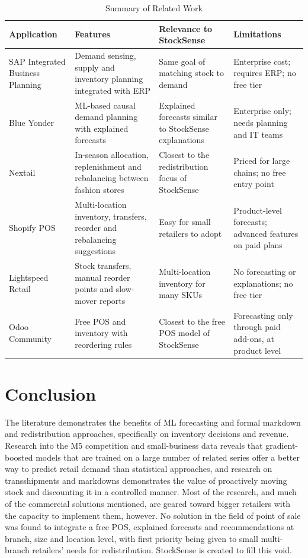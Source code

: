 \documentclass{StockSense}
\begin{document}
\begin{table}[!htbp]
\centering
\caption{Summary of Related Work}
\label{tab:related-work}
\begin{tabular}{|L{3.2cm}|L{4.1cm}|L{3.4cm}|L{3.4cm}|}
\hline
\textbf{Application} & \textbf{Features} & \textbf{Relevance to StockSense} & \textbf{Limitations} \\ \hline
SAP Integrated Business Planning~\cite{sapibp} & Demand sensing, supply and inventory planning integrated with ERP & Same goal of matching stock to demand & Enterprise cost; requires ERP; no free tier \\ \hline
Blue Yonder~\cite{blueyonder} & ML-based causal demand planning with explained forecasts & Explained forecasts similar to StockSense explanations & Enterprise only; needs planning and IT teams \\ \hline
Nextail~\cite{nextail} & In-season allocation, replenishment and rebalancing between fashion stores & Closest to the redistribution focus of StockSense & Priced for large chains; no free entry point \\ \hline
Shopify POS~\cite{shopifypos} & Multi-location inventory, transfers, reorder and rebalancing suggestions & Easy for small retailers to adopt & Product-level forecasts; advanced features on paid plans \\ \hline
Lightspeed Retail~\cite{lightspeed} & Stock transfers, manual reorder points and slow-mover reports & Multi-location inventory for many SKUs & No forecasting or explanations; no free tier \\ \hline
Odoo Community~\cite{odoo} & Free POS and inventory with reordering rules & Closest to the free POS model of StockSense & Forecasting only through paid add-ons, at product level \\ \hline
\end{tabular}
\end{table}

\section{Conclusion}

The literature demonstrates the benefits of ML forecasting and formal markdown and redistribution approaches, specifically on inventory decisions and revenue. Research into the M5 competition and small-business data reveals that gradient-boosted models that are trained on a large number of related series offer a better way to predict retail demand than statistical approaches, and research on transshipments and markdowns demonstrates the value of proactively moving stock and discounting it in a controlled manner. Most of the research, and much of the commercial solutions mentioned, are geared toward bigger retailers with the capacity to implement them, however. No solution in the field of point of sale was found to integrate a free POS, explained forecasts and recommendations at branch, size and location level, with first priority being given to small multi-branch retailers' needs for redistribution. StockSense is created to fill this void.
\end{document}
